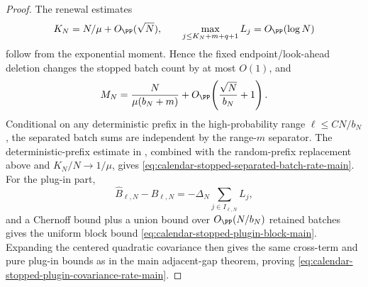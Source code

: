 \begin{proof}
The renewal estimates
\[
K_N=N/\mu+O_{\PP}(\sqrt N),\qquad
\max_{j\le K_N+m+q+1}L_j=O_{\PP}(\log N)
\]
follow from the exponential moment.  Hence the fixed endpoint/look-ahead
deletion changes the stopped batch count by at most \(O(1)\), and
\[
M_N=\frac{N}{\mu(b_N+m)}
     +O_{\PP}\!\left(\frac{\sqrt N}{b_N}+1\right).
\]
Conditional on any deterministic prefix in the high-probability range
\(\ell\le C N/b_N\), the separated batch sums are independent by the
range-\(m\) separator.  The deterministic-prefix estimate in
, combined with the
random-prefix replacement above and \(K_N/N\to1/\mu\), gives
\eqref{eq:calendar-stopped-separated-batch-rate-main}.  For the plug-in part,
\[
\widehat B_{\ell,N}-B_{\ell,N}
=-\Delta_N\sum_{j\in I_{\ell,N}}L_j,
\]
and a Chernoff bound plus a union bound over \(O_{\PP}(N/b_N)\) retained
batches gives the uniform block bound
\eqref{eq:calendar-stopped-plugin-block-main}.  Expanding the centered
quadratic covariance then gives the same cross-term and pure plug-in bounds as
in the main adjacent-gap theorem, proving
\eqref{eq:calendar-stopped-plugin-covariance-rate-main}.
\end{proof}

